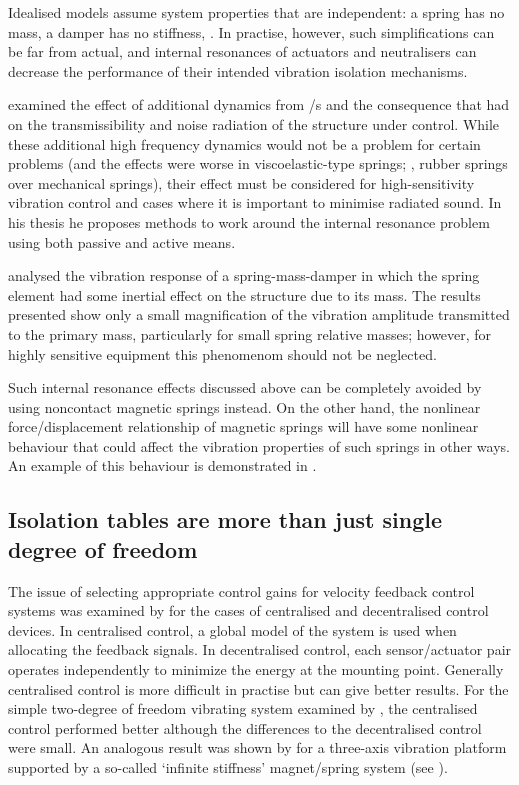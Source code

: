 Idealised models assume system properties that are independent: a spring has
no mass, a damper has no stiffness, \etc. In practise, however, such
simplifications can be far from actual, and internal resonances of actuators
and neutralisers can decrease the performance of their intended vibration
isolation mechanisms.

\textcite{du2003thesis} examined the effect of additional dynamics
from \vibneut/{}s and the consequence that had on the
transmissibility and noise radiation of the structure under
control. While these additional high frequency dynamics would not be a
problem for certain problems (and the effects were worse in
viscoelastic-type springs; \ie, rubber springs over mechanical springs),
their effect must be considered for high-sensitivity vibration control
and cases where it is important to minimise radiated sound. In his
thesis he proposes methods to work around the internal resonance
problem using both passive and active means.

\textcite{wu2006} analysed the vibration response of a spring-mass-damper in
which the spring element had some inertial effect on the structure due to its
mass. The results presented show only a small magnification of the vibration
amplitude transmitted to the primary mass, particularly for small spring
relative masses; however, for highly sensitive equipment this phenomenom
should not be neglected.

Such internal resonance effects discussed above can be completely avoided by
using noncontact magnetic springs instead. On the other hand, the nonlinear
force/displacement relationship of magnetic springs will have some nonlinear
behaviour that could affect the vibration properties of such springs in other
ways. An example of this behaviour is demonstrated in
.


\subsection{Isolation tables are more than just single degree of freedom}

The issue of selecting appropriate control gains for velocity feedback control
systems was examined by \textcite{engels2008} for the cases of centralised and
decentralised control devices. In centralised control, a global model of the
system is used when allocating the feedback signals. In decentralised control,
each sensor/actuator pair operates independently to minimize the energy at the
mounting point. Generally centralised control is more difficult in practise
but can give better results. For the simple two-degree of freedom vibrating
system examined by \textcite{engels2008}, the centralised control performed
better although the differences to the decentralised control were small. An
analogous result was shown by \textcite{hoque2006} for a three-axis vibration
platform supported by a so-called `infinite stiffness' magnet/spring system (see
).

